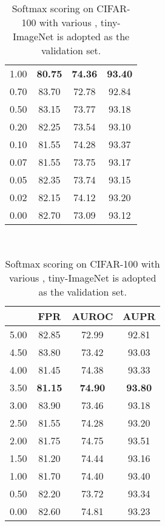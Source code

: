 \documentclass{article}
\begin{document}
\begin{table}[t]
{{\begin{tabular}{c|ccc}
\cellcolor{greyC}1.00               & \cellcolor{greyC}\textbf{80.75}                  & \cellcolor{greyC}\textbf{74.36}                  & \cellcolor{greyC}\textbf{93.40}       \\
0.70               & 83.70                  & 72.78                  & 92.84       \\
0.50               & 83.15                  & 73.77                  & 93.18       \\ 
0.20               & 82.25                  & 73.54                  & 93.10       \\
0.10               & 81.55                  & 74.28                  & 93.37       \\
0.07               & 81.55                  & 73.75                  & 93.17       \\
0.05               & 82.35                  & 73.74                  & 93.15       \\ 
0.02               & 82.15                  & 74.12                  & 93.20       \\
0.00               & 82.70                       & 73.09                        & 93.12             \\
\bottomrule[1.5pt]      
\end{tabular}
}
}~~
\parbox{.30\linewidth}{
\centering
\caption{Softmax scoring on CIFAR-100 with various , tiny-ImageNet is adopted as the validation set.} \label{tab: 43}
\scriptsize
\vspace{5pt}
{
\begin{tabular}{c|ccc}
\toprule[1.5pt]
             & FPR     & AUROC       & AUPR     \\
\midrule[0.6pt]
5.00               & 82.85                  & 72.99                  & 92.81 \\
4.50               & 83.80                  & 73.42                  & 93.03 \\
4.00               & 81.45                  & 74.38                  & 93.33 \\
\cellcolor{greyC}3.50               & \cellcolor{greyC}\textbf{81.15}                  & \cellcolor{greyC}\textbf{74.90}                  & \cellcolor{greyC}\textbf{93.80}      \\
3.00               & 83.90                  & 73.46                  & 93.18 \\
2.50               & 81.55                  & 74.28                  & 93.20 \\
2.00               & 81.75                  & 74.75                  & 93.51 \\
1.50               & 81.20                  & 74.44                  & 93.16 \\
1.00               & 81.70                  & 74.40                  & 93.40 \\
0.50               & 82.20                  & 73.72                  & 93.34 \\
0.00               & 82.60                 & 74.81                        & 93.23       \\
\bottomrule[1.5pt]      
\end{tabular}
}
}
\end{table}
\end{document}
